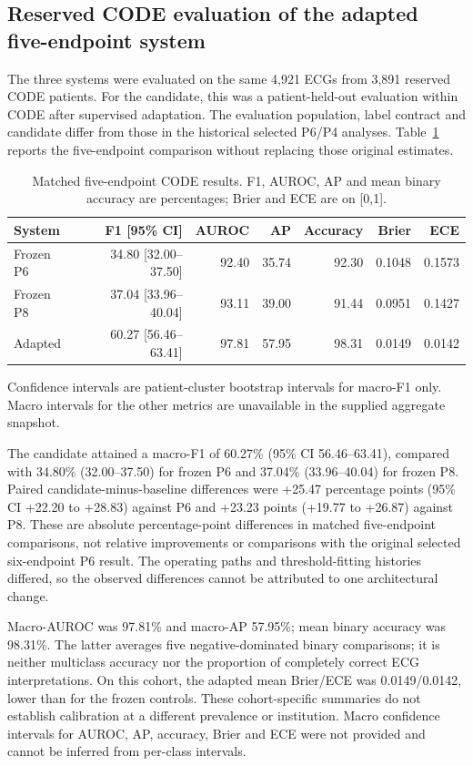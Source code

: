 \subsection{Reserved CODE evaluation of the adapted five-endpoint system}
\label{sec:code-results}
The three systems were evaluated on the same 4,921 ECGs from 3,891 reserved CODE patients. For the candidate, this was a patient-held-out evaluation within CODE after supervised adaptation. The evaluation population, label contract and candidate differ from those in the historical selected P6/P4 analyses. Table~\ref{tab:code-global} reports the five-endpoint comparison without replacing those original estimates.

\begin{table}[htbp]
\caption{Matched five-endpoint CODE results. F1, AUROC, AP and mean binary accuracy are percentages; Brier and ECE are on [0,1].\label{tab:code-global}}
\centering\small
\begin{tabular}{lrrrrrr}
\toprule
System & F1 [95\% CI] & AUROC & AP & Accuracy & Brier & ECE \\
\midrule
Frozen P6 & 34.80 [32.00--37.50] & 92.40 & 35.74 & 92.30 & 0.1048 & 0.1573 \\
Frozen P8 & 37.04 [33.96--40.04] & 93.11 & 39.00 & 91.44 & 0.0951 & 0.1427 \\
Adapted & 60.27 [56.46--63.41] & 97.81 & 57.95 & 98.31 & 0.0149 & 0.0142 \\
\bottomrule
\end{tabular}
\par\smallskip\parbox{\linewidth}{\footnotesize Confidence intervals are patient-cluster bootstrap intervals for macro-F1 only. Macro intervals for the other metrics are unavailable in the supplied aggregate snapshot.}
\end{table}

The candidate attained a macro-F1 of 60.27\% (95\% CI 56.46--63.41), compared with 34.80\% (32.00--37.50) for frozen P6 and 37.04\% (33.96--40.04) for frozen P8. Paired candidate-minus-baseline differences were +25.47 percentage points (95\% CI +22.20 to +28.83) against P6 and +23.23 points (+19.77 to +26.87) against P8. These are absolute percentage-point differences in matched five-endpoint comparisons, not relative improvements or comparisons with the original selected six-endpoint P6 result. The operating paths and threshold-fitting histories differed, so the observed differences cannot be attributed to one architectural change.

Macro-AUROC was 97.81\% and macro-AP 57.95\%; mean binary accuracy was 98.31\%. The latter averages five negative-dominated binary comparisons; it is neither multiclass accuracy nor the proportion of completely correct ECG interpretations. On this cohort, the adapted mean Brier/ECE was 0.0149/0.0142, lower than for the frozen controls. These cohort-specific summaries do not establish calibration at a different prevalence or institution. Macro confidence intervals for AUROC, AP, accuracy, Brier and ECE were not provided and cannot be inferred from per-class intervals.

